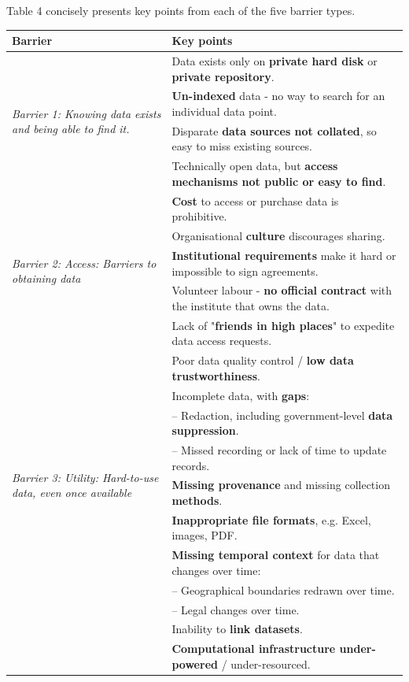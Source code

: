 \documentclass{CUP-JNL-DAP}%
\begin{document}
Table 4 concisely presents key points from each of the five barrier types. 
\begin{table}[ht!]
    \centering
    \begin{tabular}{ | l | l| }
       \hline
       \textbf{Barrier} & \textbf{Key points} \\
       \hline
         \multirow{4}{10em}{\textit{Barrier 1: Knowing data exists and being able to find it.}} 
          & Data exists only on \textbf{private hard disk} or \textbf{private repository}.\\
          & \textbf{Un-indexed} data - no way to search for an individual data point.\\
          & Disparate \textbf{data sources not collated}, so easy to miss existing sources.\\
          & Technically open data, but \textbf{access mechanisms not public or easy to find}. \\
         \hline
          \multirow{5}{10em}{\textit{Barrier 2: Access: Barriers to obtaining data}} 
         & \textbf{Cost} to access or purchase data is prohibitive. \\
         & Organisational \textbf{culture} discourages sharing.\\
         & \textbf{Institutional requirements} make it hard or impossible to sign agreements. \\
         & Volunteer labour - \textbf{no official contract} with the institute that owns the data. \\
         & Lack of "\textbf{friends in high places}" to expedite data access requests.\\
         \hline
         \multirow{9}{10em}{\textit{Barrier 3: Utility: Hard-to-use data, even once available}} 
         & Poor data quality control / \textbf{low data trustworthiness}.\\
         & Incomplete data, with \textbf{gaps}: \\
         & -- Redaction, including government-level \textbf{data suppression}.\\
         & -- Missed recording or lack of time to update records.\\
         & \textbf{Missing provenance} and missing collection \textbf{methods}. \\
         & \textbf{Inappropriate file formats}, e.g. Excel, images, PDF.\\
         & \textbf{Missing \textbf{temporal} context} for data that changes over time:\\
         & -- Geographical boundaries redrawn over time.\\
         & -- Legal changes over time. \\
         & Inability to \textbf{link datasets}. \\
         & \textbf{Computational infrastructure under-powered} / under-resourced. \\
           

\end{tabular}
\end{table}
\end{document}
